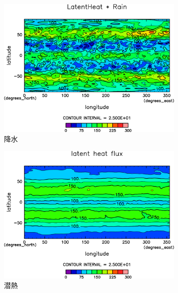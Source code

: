 \documentclass[body]{subfiles}
\begin{document}
\begin{figure}[t]
\begin{subfigure}{.4\textwidth}
		\includegraphics[width=\textwidth]{S1800/Rain,time=3650:4015-crop-rotate.pdf}
		\caption{降水\hmu*{[W/m^{-2}]}}\label{S1800降水}
	\end{subfigure}
	\begin{subfigure}{.4\textwidth}
		\centering
		\includegraphics[width=\textwidth]{S1800/Evap,time=3650:4015-crop-rotate.pdf}
		\caption{潜熱\hmu*{[W/m^{-2}]}}\label{S1800潜熱}
	\end{subfigure}
	\begin{subfigure}{.4\textwidth}
		\centering

\end{subfigure}
\end{figure}
\end{document}
